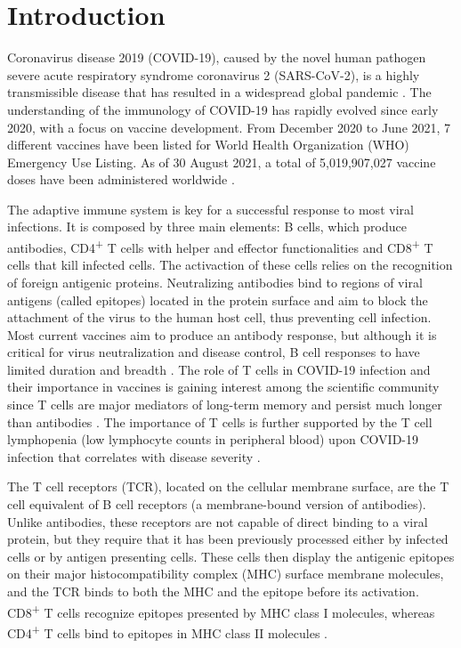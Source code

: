 \chapter*{Introduction}


Coronavirus disease 2019 (COVID-19), caused by the novel human pathogen severe acute respiratory syndrome coronavirus 2 (SARS-CoV-2), is a highly transmissible disease that has resulted in a widespread global pandemic \citep{hu}. The understanding of the immunology of COVID-19 has rapidly evolved since early 2020, with a focus on vaccine development. From December 2020 to June 2021, 7 different vaccines have been listed for World Health Organization (WHO) Emergency Use Listing. As of 30 August 2021, a total of 5,019,907,027 vaccine doses have been administered worldwide \citep{who}.

The adaptive immune system is key for a successful response to most viral infections. It is composed by three main elements: B cells, which produce antibodies, CD4\textsuperscript{+} T cells with helper and effector functionalities and CD8\textsuperscript{+} T cells that kill infected cells. The activaction of these cells relies on the recognition of foreign antigenic proteins. Neutralizing antibodies bind to regions of viral antigens (called epitopes) located in the protein surface and aim to block the attachment of the virus to the human host cell, thus preventing cell infection. Most current vaccines aim to produce an antibody response, but although it is critical for virus neutralization and disease control, B cell responses to \covid{} have limited duration and breadth \citep{vaccinetcell}. The role of T cells in COVID-19 infection and their importance in vaccines is gaining interest among the scientific community since T cells are major mediators of long-term memory and persist much longer than antibodies \citep{tcellsdiag}. The importance of T cells is further supported by the T cell lymphopenia (low lymphocyte counts in peripheral blood) upon COVID-19 infection that correlates with disease severity \citep{lymphopeniaseverity}.


The T cell receptors (TCR), located on the cellular membrane surface, are the T cell equivalent of B cell receptors (a membrane-bound version of antibodies). Unlike antibodies, these receptors are not capable of direct binding to a viral protein, but they require that it has been previously processed either by infected cells or by antigen presenting cells. These cells then display the antigenic epitopes on their major histocompatibility complex (MHC) surface membrane molecules, and the TCR binds to both the MHC and the epitope before its activation. CD8\textsuperscript{+} T cells recognize epitopes presented by MHC class I molecules, whereas CD4\textsuperscript{+} T cells bind to epitopes in MHC class II molecules \citep{janeway}.

